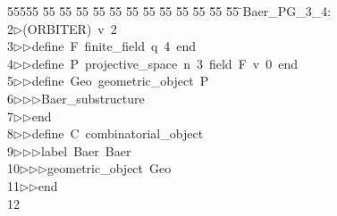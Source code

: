 %
%
\begin{tabbing}
55555 \= 55 \= 55 \= 55 \= 55 \= 55 \= 55 \= 55 \= 55 \= 55 \= 55 \= 55 \= 55 \= \>Baer\_PG\_3\_4:\\[0pt]
2\>$\triangleright$\>(ORBITER)\ v\ 2\ \\[0pt]
3\>$\triangleright$\>$\triangleright$\>define\ F\ finite\_field\ q\ 4\ end\ \\[0pt]
4\>$\triangleright$\>$\triangleright$\>define\ P\ projective\_space\ n\ 3\ field\ F\ v\ 0\ end\ \\[0pt]
5\>$\triangleright$\>$\triangleright$\>define\ Geo\ geometric\_object\ P\ \\[0pt]
6\>$\triangleright$\>$\triangleright$\>$\triangleright$\>Baer\_substructure\ \\[0pt]
7\>$\triangleright$\>$\triangleright$\>end\ \\[0pt]
8\>$\triangleright$\>$\triangleright$\>define\ C\ combinatorial\_object\ \\[0pt]
9\>$\triangleright$\>$\triangleright$\>$\triangleright$\>label\ Baer\ Baer\ \\[0pt]
10\>$\triangleright$\>$\triangleright$\>$\triangleright$\>geometric\_object\ Geo\ \\[0pt]
11\>$\triangleright$\>$\triangleright$\>end\\[0pt]
12\>\end{tabbing}
